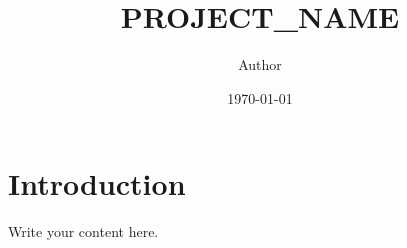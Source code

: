 \documentclass{article}
\title{{{PROJECT_NAME}}}
\author{Author}
\date{\today}
\begin{document}
\maketitle

\section{Introduction}
Write your content here.
\end{document}
